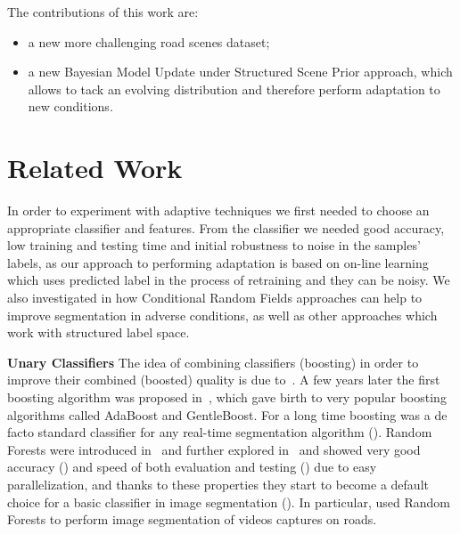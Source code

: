 The contributions of this work are:
\begin{itemize}
 \item a new more challenging road scenes dataset;
 \item a new Bayesian Model Update under Structured Scene Prior approach, which allows to tack an evolving distribution and therefore perform adaptation
 to new conditions.
\end{itemize}

\section{Related Work}
In order to experiment with adaptive techniques we first needed to choose an appropriate classifier and features. From the classifier
we needed good accuracy, low training and testing time and initial robustness to noise in the samples' labels, as our approach to performing adaptation
is based on on-line learning which uses predicted label in the process of retraining and they can be noisy. We also investigated in how Conditional
Random Fields approaches can help to improve segmentation in adverse conditions, as well as other approaches which work with structured label space.

{\bf Unary Classifiers} \qquad The idea of combining classifiers (boosting) in order to improve their combined (boosted) quality is due to~\cite{Schapire1990}. A few years later the 
first boosting
algorithm was proposed in~\cite{Freund1995}, which gave birth to very popular boosting algorithms called AdaBoost and GentleBoost. For a long time
boosting was a de facto standard classifier for any real-time segmentation algorithm (\cite{Shotton2009, Osa2001}).
Random Forests were introduced in~\cite{Breiman2001} and further explored in~\cite{Geurts2006} and showed very good accuracy (\cite{Shotton2008})
and speed of both evaluation and testing (\cite{Sharp2008}) due to easy parallelization, and thanks to these properties they start to become
a default choice for a basic classifier in image segmentation (\cite{Brostow2008, Shotton2008, Kontschieder2011}). In particular, \cite{Brostow2008}
used Random Forests to perform image segmentation of videos captures on roads.

